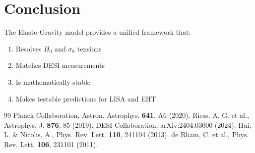 \documentclass[aps,prd,preprint,superscriptaddress]{revtex4-2}
\begin{document}
\section{Conclusion}

The Elasto-Gravity model provides a unified framework that:
\begin{enumerate}
\item Resolves $H_0$ and $\sigma_8$ tensions
\item Matches DESI measurements
\item Is mathematically stable
\item Makes testable predictions for LISA and EHT
\end{enumerate}

\begin{thebibliography}{99}
 Planck Collaboration, Astron. Astrophys. {\bf 641}, A6 (2020).
 Riess, A. G. et al., Astrophys. J. {\bf 876}, 85 (2019).
 DESI Collaboration, arXiv:2404.03000 (2024).
 Hui, L. \& Nicolis, A., Phys. Rev. Lett. {\bf 110}, 241104 (2013).
 de Rham, C. et al., Phys. Rev. Lett. {\bf 106}, 231101 (2011).
\end{thebibliography}
\end{document}
